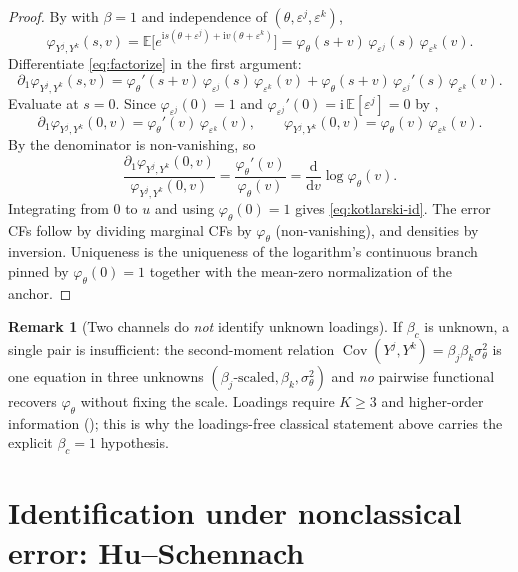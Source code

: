 \documentclass[11pt]{article}
\theoremstyle{definition}
\newtheorem{remark}{Remark}
\newcommand{\E}{\mathbb{E}}
\newcommand{\Cov}{\operatorname{Cov}}
\newcommand{\ii}{\mathrm{i}}          %
\newcommand{\Th}{\theta}
\newcommand{\lat}{\Th}
\begin{document}
\begin{proof}
By  with $\beta=1$ and independence of $(\lat,\varepsilon^j,
\varepsilon^k)$,
\begin{equation}\label{eq:factorize}
  \varphi_{Y^j,Y^k}(s,v)
  =\E\!\big[e^{\ii s(\lat+\varepsilon^j)+\ii v(\lat+\varepsilon^k)}\big]
  =\varphi_{\lat}(s+v)\,\varphi_{\varepsilon^j}(s)\,\varphi_{\varepsilon^k}(v).
\end{equation}
Differentiate \eqref{eq:factorize} in the first argument:
\[
  \partial_1\varphi_{Y^j,Y^k}(s,v)
  =\varphi_{\lat}'(s+v)\,\varphi_{\varepsilon^j}(s)\,\varphi_{\varepsilon^k}(v)
  +\varphi_{\lat}(s+v)\,\varphi_{\varepsilon^j}'(s)\,\varphi_{\varepsilon^k}(v).
\]
Evaluate at $s=0$. Since $\varphi_{\varepsilon^j}(0)=1$ and
$\varphi_{\varepsilon^j}'(0)=\ii\,\E[\varepsilon^j]=0$ by ,
\[
  \partial_1\varphi_{Y^j,Y^k}(0,v)
  =\varphi_{\lat}'(v)\,\varphi_{\varepsilon^k}(v),
  \qquad
  \varphi_{Y^j,Y^k}(0,v)=\varphi_{\lat}(v)\,\varphi_{\varepsilon^k}(v).
\]
By  the denominator is non-vanishing, so
\[
  \frac{\partial_1\varphi_{Y^j,Y^k}(0,v)}{\varphi_{Y^j,Y^k}(0,v)}
  =\frac{\varphi_{\lat}'(v)}{\varphi_{\lat}(v)}
  =\frac{\mathrm d}{\mathrm dv}\log\varphi_{\lat}(v).
\]
Integrating from $0$ to $u$ and using $\varphi_{\lat}(0)=1$ gives
\eqref{eq:kotlarski-id}. The error CFs follow by dividing marginal CFs by
$\varphi_{\lat}$ (non-vanishing), and densities by inversion. Uniqueness is the
uniqueness of the logarithm's continuous branch pinned by
$\varphi_\lat(0)=1$ together with the mean-zero normalization of the anchor.
\end{proof}

\begin{remark}[Two channels do \emph{not} identify unknown loadings]
\label{rem:loadings}
If $\beta_c$ is unknown, a single pair is insufficient: the second-moment
relation $\Cov(Y^j,Y^k)=\beta_j\beta_k\sigma_\lat^2$ is one equation in three
unknowns $(\beta_j\text{-scaled},\beta_k,\sigma_\lat^2)$ and \emph{no} pairwise
functional recovers $\varphi_\lat$ without fixing the scale. Loadings require
$K\ge3$ and higher-order information (); this is why the
loadings-free classical statement above carries the explicit $\beta_c=1$
hypothesis.
\end{remark}

\section{Identification under nonclassical error: Hu--Schennach}
\label{sec:HS}
\end{document}
